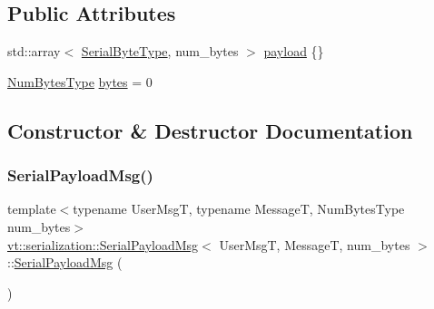 \subsection*{Public Attributes}
\begin{DoxyCompactItemize}
\item 
std\+::array$<$ \hyperlink{namespacevt_1_1serialization_a74f8d1a55940f9c38fc29522de66d926}{Serial\+Byte\+Type}, num\+\_\+bytes $>$ \hyperlink{structvt_1_1serialization_1_1_serial_payload_msg_ab71d301de848ba00a812bfaf3a0cc44e}{payload} \{\}
\item 
\hyperlink{namespacevt_1_1serialization_aaa03b9b407ed5776043c163629312e40}{Num\+Bytes\+Type} \hyperlink{structvt_1_1serialization_1_1_serial_payload_msg_ac9022dd53be215aeca6b300f84834806}{bytes} = 0
\end{DoxyCompactItemize}


\subsection{Constructor \& Destructor Documentation}
\mbox{\label{structvt_1_1serialization_1_1_serial_payload_msg_ace671323292af96db63162020c968bc8}} 
\subsubsection{\texorpdfstring{Serial\+Payload\+Msg()}{SerialPayloadMsg()}\hspace{0.1cm}{\footnotesize\ttfamily [1/3]}}
{\footnotesize\ttfamily template$<$typename User\+MsgT, typename MessageT, Num\+Bytes\+Type num\+\_\+bytes$>$ \\
\hyperlink{structvt_1_1serialization_1_1_serial_payload_msg}{vt\+::serialization\+::\+Serial\+Payload\+Msg}$<$ User\+MsgT, MessageT, num\+\_\+bytes $>$\+::\hyperlink{structvt_1_1serialization_1_1_serial_payload_msg}{Serial\+Payload\+Msg} (\begin{DoxyParamCaption}{ }\end{DoxyParamCaption})\hspace{0.3cm}{\ttfamily [inline]}}

\mbox{\label{structvt_1_1serialization_1_1_serial_payload_msg_a8e63da32454ab38b811cbeff74bb900d}} 
